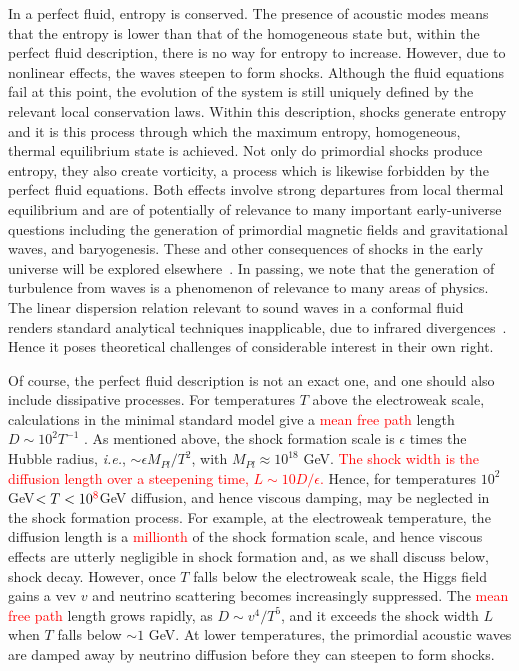 \documentclass[prl,aps,10pt,twocolumn,showkeys,nofootinbib]{revtex4-1}
\begin{document}
In a perfect fluid, entropy is conserved. The presence of acoustic modes means that the entropy is lower than that of the homogeneous state but, within the perfect fluid description, there is no way for entropy to increase. However, due to nonlinear effects, the waves steepen to form shocks. Although the fluid equations fail at this point, the evolution of the system is still uniquely defined by the relevant local conservation laws. Within this description, shocks generate entropy and it is this process through which the maximum entropy, homogeneous, thermal equilibrium state is achieved. Not only do primordial shocks produce entropy, they also create vorticity, a process which is likewise forbidden by the perfect fluid equations. Both effects involve strong departures from local thermal equilibrium and are of potentially of relevance to many important early-universe questions including the generation of primordial magnetic fields and gravitational waves, and baryogenesis. These and other consequences of shocks in the early universe will be explored elsewhere~\cite{penturoklong}. In passing, we note that the generation of turbulence from waves is a phenomenon of relevance to many areas of physics.  The linear dispersion relation relevant to sound waves in a conformal fluid renders standard analytical techniques inapplicable, due to infrared divergences~\cite{ZLF}. Hence it poses theoretical challenges of considerable interest in their own right. 

Of course, the perfect fluid description is not an exact one, and one should also include dissipative processes.  For temperatures $T$ above the electroweak scale, calculations in the minimal standard model give a \textcolor{red}{mean free path} length $D \sim 10^2 T^{-1}$ \cite{moore}. As mentioned above, the shock formation scale is $\epsilon$ times the Hubble radius, {\it i.e.}, $\sim \epsilon M_{Pl}/T^2$, with $M_{Pl}\approx 10^{18}$ GeV. \textcolor{red}{The shock width is the diffusion length over a steepening time, $L\sim 10 D/\epsilon$\cite{LL}.}  Hence, for temperatures $10^2$ GeV$< T <10^{\textcolor{red}{8}}$GeV diffusion, and hence viscous damping, may be neglected in the shock formation process. For example, at the electroweak temperature, the diffusion length is a \textcolor{red}{millionth} of the shock formation scale, and hence viscous effects are utterly negligible in shock formation and, as we shall discuss below, shock decay.  However, once $T$ falls below the electroweak scale, the Higgs field gains a vev $v$ and neutrino scattering becomes increasingly suppressed. The \textcolor{red}{mean free path} length grows rapidly, as $D\sim v^4/T^5$, and it exceeds the shock width $L$ \cite{penturoklong} when $T$ falls below $\sim 1$ GeV. At lower temperatures, the primordial acoustic waves are damped away by neutrino diffusion before they can steepen to form shocks.
\end{document}
